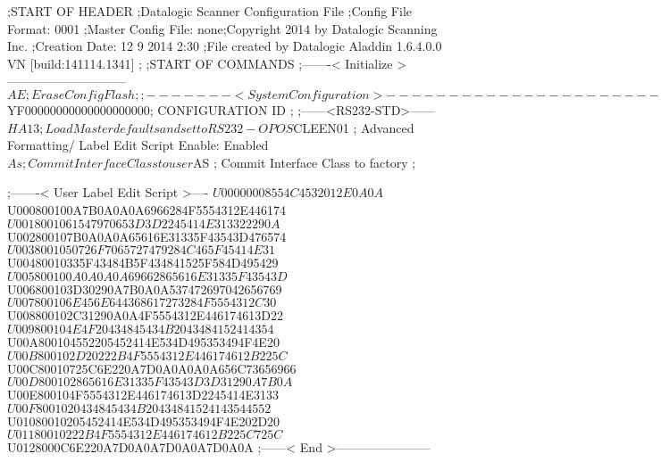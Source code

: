 ;START OF HEADER
;Datalogic Scanner Configuration File
;Config File Format: 0001
;Master Config File: none;Copyright 2014 by Datalogic Scanning Inc.
;Creation Date: 12 9 2014 2:30
;File created by Datalogic Aladdin 1.6.4.0.0 VN [build:141114.1341]
;
;START OF COMMANDS
;-------< Initialize >-----------------------------
$AE                 ; Erase Config Flash
;
;-------< System Configuration >-------------------------------
$YF00000000000000000000; CONFIGURATION ID
;
;------<RS232-STD>------
$HA13               ; Load Master defaults and set to RS232-OPOS
$CLEEN01            ; Advanced Formatting/ Label Edit Script Enable: Enabled
$As                 ; Commit Interface Class to user
$AS                 ; Commit Interface Class to factory
;

;-------< User Label Edit Script >----
$U00000008554C4532012E0A0A
$U000800100A7B0A0A0A6966284F5554312E446174
$U0018001061547970653D3D2245414E313322290A
$U002800107B0A0A0A65616E31335F43543D476574
$U0038001050726F7065727479284C465F45414E31
$U00480010335F43484B5F434841525F584D495429
$U005800100A0A0A0A69662865616E31335F43543D
$U006800103D30290A7B0A0A537472697042656769
$U007800106E456E644368617273284F5554312C30
$U008800102C31290A0A4F5554312E446174613D22
$U009800104E4F20434845434B2043484152414354
$U00A800104552205452414E534D495353494F4E20
$U00B800102D20222B4F5554312E446174612B225C
$U00C80010725C6E220A7D0A0A0A0A656C73656966
$U00D800102865616E31335F43543D3D31290A7B0A
$U00E800104F5554312E446174613D2245414E3133
$U00F8001020434845434B20434841524143544552
$U01080010205452414E534D495353494F4E202D20
$U01180010222B4F5554312E446174612B225C725C
$U0128000C6E220A7D0A0A7D0A0A7D0A0A
;------< End >-----------------------
